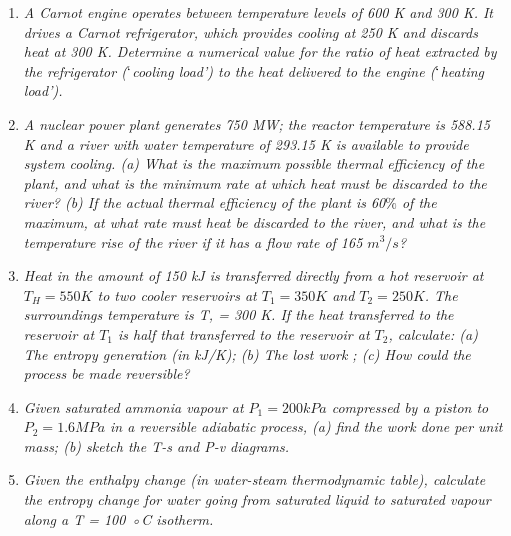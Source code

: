 \begin{enumerate}
\item {\it A Carnot engine operates between temperature levels of 600 K and 300 K. It drives a Carnot refrigerator, which provides cooling at 250 K and discards heat at 300 K. Determine a numerical value for the ratio of heat extracted by the refrigerator ($\lq$cooling load') to the heat delivered to the engine ($\lq$heating load').}

\item {\it A nuclear power plant generates 750 MW; the reactor temperature is 588.15 K and a river with water temperature of 293.15 K is available to provide system cooling. (a) What is the maximum possible thermal efficiency of the plant, and what is the minimum rate at which heat must be discarded to the river? (b)  If the actual thermal efficiency of the plant is 60$\%$ of the maximum, at what rate must heat be discarded to the river, and what is the temperature rise of the river if it has a flow rate of 165 $m^{3}/s$?}

\item {\it Heat in the amount of 150 kJ is transferred directly from a hot reservoir at $T_{H} = 550 K$
to two cooler reservoirs at $T_{1} = 350 K$ and $T_{2} = 250 K$. The surroundings temperature is T, = 300 K. If the heat transferred to the reservoir at $T_{1}$ is half that transferred to the reservoir at $T_{2}$, calculate: (a) The entropy generation (in kJ/K); (b) The lost work ; (c) How could the process be made reversible?}


\item {\it Given saturated ammonia vapour at $P_{1} = 200 kPa$ compressed by a piston to $P_{2} = 1.6 MPa$ in a
reversible adiabatic process, (a) find the work done per unit mass; (b) sketch the T-s and P-v diagrams.}

\item {\it Given the enthalpy change (in water-steam thermodynamic table), calculate the entropy change for water going from saturated liquid to saturated vapour along a T = 100 ◦C isotherm.}



\end{enumerate}

